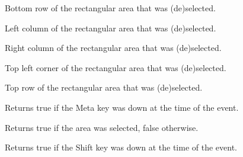 \label{wxgridrangeselecteventgetbottomrow}


Bottom row of the rectangular area that was (de)selected.

\label{wxgridrangeselecteventgetleftcol}


Left column of the rectangular area that was (de)selected.

\label{wxgridrangeselecteventgetrightcol}


Right column of the rectangular area that was (de)selected.

\label{wxgridrangeselecteventgettopleftcoords}


Top left corner of the rectangular area that was (de)selected.

\label{wxgridrangeselecteventgettoprow}


Top row of the rectangular area that was (de)selected.

\label{wxgridrangeselecteventmetadown}


Returns true if the Meta key was down at the time of the event.

\label{wxgridrangeselecteventselecting}


Returns true if the area was selected, false otherwise.

\label{wxgridrangeselecteventshiftdown}


Returns true if the Shift key was down at the time of the event.

\section{}\label{wxgridsizeevent}

